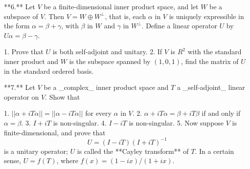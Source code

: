 **6.** Let \(V\) be a finite-dimensional inner product space, and let \(W\) be a subspace of \(V\). Then \(V=W\oplus W^{\perp}\), that is, each \(\alpha\) in \(V\) is uniquely expressible in the form \(\alpha=\beta+\gamma\), with \(\beta\) in \(W\) and \(\gamma\) in \(W^{\perp}\). Define a linear operator \(U\) by \(U\alpha=\beta-\gamma\).

1. Prove that \(U\) is both self-adjoint and unitary.
2. If \(V\) is \(R^{2}\) with the standard inner product and \(W\) is the subspace spanned by \((1,0,1)\), find the matrix of \(U\) in the standard ordered basis.

**7.** Let \(V\) be a _complex_ inner product space and \(T\) a _self-adjoint_ linear operator on \(V\). Show that

1. \(||\alpha+iT\alpha||=||\alpha-iT\alpha||\) for every \(\alpha\) in \(V\).
2. \(\alpha+iT\alpha=\beta+iT\beta\) if and only if \(\alpha=\beta\).
3. \(I+iT\) is non-singular.
4. \(I-iT\) is non-singular.
5. Now suppose \(V\) is finite-dimensional, and prove that \[U=(I-iT)(I+iT)^{-1}\] is a unitary operator; \(U\) is called the **Cayley transform** of \(T\). In a certain sense, \(U=f(T)\), where \(f(x)=(1-ix)/(1+ix)\).

 